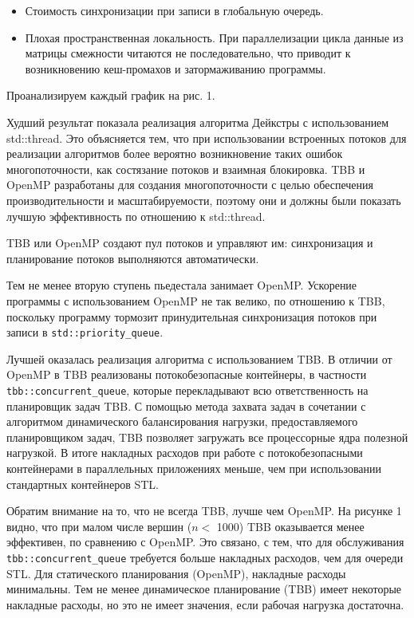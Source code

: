 \documentclass{article}
\begin{document}
\begin{itemize}
\item Стоимость синхронизации при записи в глобальную очередь.
\item Плохая пространственная локальность. При параллелизации цикла данные из матрицы смежности читаются не последовательно, что приводит к возникновению кеш-промахов и затормаживанию программы.
\end{itemize} 

\par Проанализируем каждый график на рис. 1.

\par Худший результат показала реализация алгоритма Дейкстры с использованием std::thread. Это объясняется тем, что при использовании встроенных потоков для реализации алгоритмов более вероятно возникновение таких ошибок многопоточности, как состязание потоков и взаимная блокировка. TBB и OpenMP разработаны для создания многопоточности с целью обеспечения производительности и масштабируемости, поэтому они и должны были показать лучшую эффективность по отношению к std::thread.

\par TBB или OpenMP создают пул потоков и управляют им: синхронизация и планирование потоков выполняются автоматически.
 
\par Тем не менее вторую ступень пьедестала занимает OpenMP. Ускорение программы с использованием OpenMP не так велико, по отношению к TBB, поскольку программу тормозит принудительная синхронизация потоков при записи в \verb|std::priority_queue|.

\par Лучшей оказалась реализация алгоритма с использованием TBB. В отличии от OpenMP в TBB реализованы потокобезопасные контейнеры, в частности \verb|tbb::concurrent_queue|, которые перекладывают всю ответственность на планировщик задач TBB. С помощью метода захвата задач в сочетании с алгоритмом динамического балансирования нагрузки, предоставляемого планировщиком задач, TBB позволяет загружать все процессорные ядра полезной нагрузкой. В итоге накладных
расходов при работе с потокобезопасными контейнерами в параллельных приложениях меньше, чем при использовании стандартных контейнеров STL.

\par Обратим внимание на то, что не всегда TBB, лучше чем OpenMP. На рисунке 1 видно, что при малом числе вершин ($n < $ 1000) TBB оказывается менее эффективен, по сравнению с OpenMP. Это связано, с тем, что для обслуживания \verb|tbb::concurrent_queue| требуется больше накладных расходов, чем для очереди STL. Для статического планирования (OpenMP), накладные расходы минимальны. Тем не менее динамическое планирование (TBB) имеет некоторые накладные расходы, но это не имеет значения, если рабочая нагрузка достаточна. 
 
\end{document}
